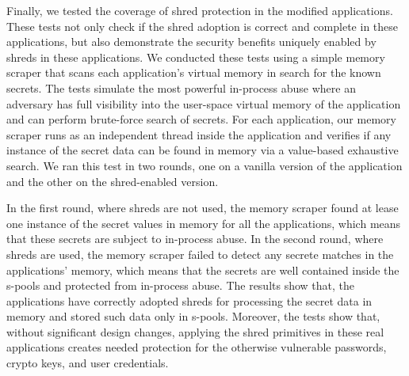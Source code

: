 Finally, we tested the coverage of shred protection in the \numopensource modified applications. These tests not only check if the shred adoption is correct and complete in these applications, but also demonstrate the security benefits uniquely enabled by shreds in these applications. 
We conducted these tests using a simple memory scraper that scans each application's virtual memory in search for the known secrets. The tests simulate the most powerful in-process abuse where an adversary has full visibility into the user-space virtual memory of the application and can perform brute-force search of secrets. 
For each application, our memory scraper runs as an independent thread inside the application and verifies if any instance of the secret data can be found in memory via a value-based exhaustive search. We ran this test in two rounds, one on a vanilla version of the application and the other on the shred-enabled version. 


In the first round, where shreds are not used, the memory scraper found at lease one instance of the secret values in memory for all the applications, which means that these secrets are subject to in-process abuse. 
In the second round, where shreds are used, the memory scraper failed to detect any secrete matches in the applications' memory, which means that the secrets are well contained inside the s-pools and protected from  in-process abuse. 
The results show that, the applications have correctly adopted shreds for processing the secret data in memory and stored such data only in s-pools. Moreover, the tests show that, without significant design changes, applying the shred primitives in these real applications creates needed protection for the otherwise vulnerable passwords, crypto keys, and user credentials. 

